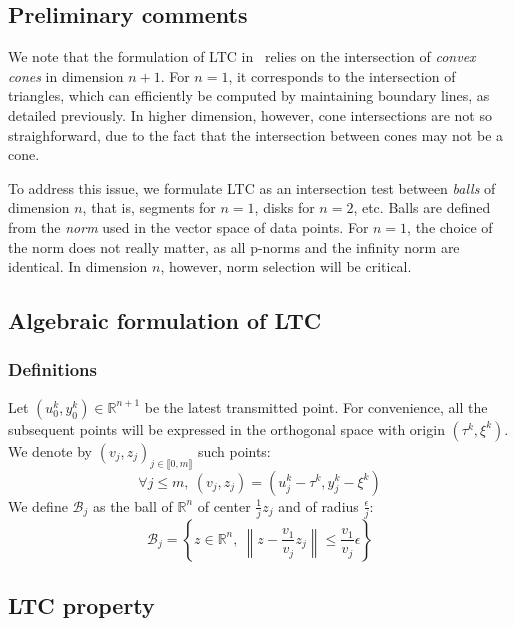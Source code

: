 \documentclass[10pt, conference, compsocconf]{IEEEtran}
\newcommand{\norm}[1]{\left\lVert#1\right\rVert}
\begin{document}
\subsection{Preliminary comments}

We note that the formulation of LTC in~\cite{schoellhammer2004lightweight} relies on
the intersection of \emph{convex cones} in dimension $n+1$. For $n=1$, it
corresponds to the intersection of triangles, which can efficiently be
computed by maintaining boundary lines, as detailed previously. In higher dimension, however, cone intersections are not so
straighforward, due to the fact that the intersection between cones
may not be a cone.

To address this issue, we formulate LTC as an intersection test between
\emph{balls} of dimension $n$, that is, segments for $n=1$, disks for
$n=2$, etc. Balls are defined from the \emph{norm} used in
the vector space of data points. For $n=1$, the choice of the norm does
not really matter, as all p-norms and the infinity norm are identical.
In dimension $n$, however, norm selection will be critical.

\subsection{Algebraic formulation of LTC}

\subsubsection{Definitions}

Let $(u_0^k, y_0^k) \in \mathbb{R}^{n+1}$ be the latest transmitted point. For convenience, all the subsequent points will be
expressed in the orthogonal space with origin $(\tau^k, \xi^k)$. We denote by $(v_j, z_j)_{j \in \llbracket 0, m \rrbracket}$ such points:
\begin{equation*}
\forall j \leq m,\  (v_j, z_j) = (u_j^k - \tau^k, y_j^k - \xi^k)
\end{equation*}
We define $\mathcal{B}_j$ as the ball of $\mathbb{R}^n$ of center $\frac{1}{j}z_j$ and of radius
$\frac{\epsilon}{j}$:
\begin{equation*}
\mathcal{B}_j = \left\{ z \in \mathbb{R}^n,\  \norm{z-\frac{v_1}{v_j}z_j} \leq \frac{v_1}{v_j}\epsilon \right\}
\end{equation*}

\subsection{LTC property}
\end{document}
